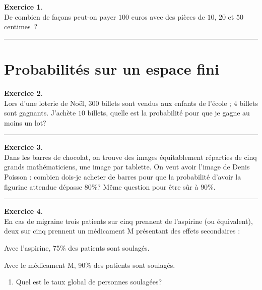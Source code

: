 \documentclass[a4paper,10pt]{article}
\theoremstyle{definition}
\theoremstyle{definition}
\newtheorem{exo}{Exercice}
\begin{document}
\begin{minipage}{1\linewidth}
\begin{minipage}[t]{0.48\linewidth}
	
	\begin{exo}\quad\\
		De combien de façons peut-on payer $100$ euros avec des pièces de $10$, $20$ et $50$ centimes~?
		
		\centering
		\rule{1\linewidth}{0.6pt}
	\end{exo}	
	\end{minipage}
\end{minipage}

\section*{Probabilités sur un espace fini}
\begin{minipage}{1\linewidth}
	\begin{minipage}[t]{0.48\linewidth}
		\raggedright
		
		
		

	\begin{exo}\quad\\
		Lors d'une loterie de Noël, $300$ billets sont
		vendus aux enfants de l'école ; $4$ billets sont gagnants.
		J'achète $10$ billets, quelle est la probabilité pour que je gagne au moins un lot?
		
		\centering
		\rule{1\linewidth}{0.6pt}
	\end{exo}
		
		\begin{exo}\quad\\
		Dans les barres de chocolat, on trouve des images équitablement
		réparties de cinq grands mathématiciens, une image par
		tablette. On veut avoir l'image de Denis Poisson : combien dois-je
		acheter de barres pour que la probabilité d'avoir la figurine attendue dépasse $80$\%? 
		Même question pour être sûr à $90$\%.
			
			\centering
			\rule{1\linewidth}{0.6pt}
		\end{exo}
		
		\begin{exo} \quad\\
		En cas de migraine trois patients sur cinq prennent de l'aspirine
		(ou équivalent), deux sur cinq prennent un médicament M présentant des effets secondaires :
		
		Avec l'aspirine, 75\% des patients sont soulagés.
		
		Avec le médicament M, 90\% des patients sont soulagés.
		\begin{enumerate}
			\item Quel est le taux global de personnes soulagées?
			

\end{enumerate}
\end{exo}
\end{minipage}
\end{minipage}
\end{document}
